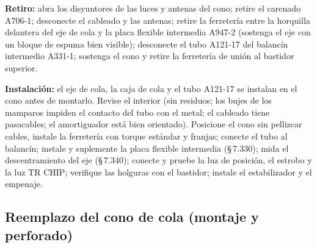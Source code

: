 \textbf{Retiro:} abra los disyuntores de las luces y antenas del cono; retire el carenado A706-1; desconecte el cableado y las antenas; retire la ferretería entre la horquilla delantera del eje de cola y la placa flexible intermedia A947-2 (sostenga el eje con un bloque de espuma bien visible); desconecte el tubo A121-17 del balancín intermedio A331-1; sostenga el cono y retire la ferretería de unión al bastidor superior.

\textbf{Instalación:} el eje de cola, la caja de cola y el tubo A121-17 se instalan en el cono antes de montarlo. Revise el interior (sin residuos; los bujes de los mamparos impiden el contacto del tubo con el metal; el cableado tiene pasacables; el amortiguador está bien orientado). Posicione el cono sin pellizcar cables, instale la ferretería con torque estándar y franjas; conecte el tubo al balancín; instale y suplemente la placa flexible intermedia (\S\,7.330); mida el descentramiento del eje (\S\,7.340); conecte y pruebe la luz de posición, el estrobo y la luz \textsf{TR CHIP}; verifique las holguras con el bastidor; instale el estabilizador y el empenaje.

\subsection{Reemplazo del cono de cola (montaje y perforado)}

